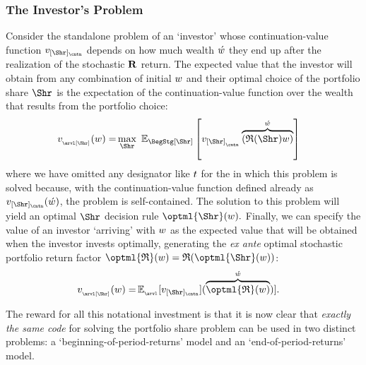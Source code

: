 \documentclass[\econtexRoot/SolvingMicroDSOPs]{subfiles}
\begin{document}
\hypertarget{subsubsec:investors-problem}{}
\subsubsection{The Investor's Problem}\label{subsubsec:investors-problem}

Consider the standalone problem of an `investor' whose continuation-value function $\vFunc_{[\Shr]_\cntn}$ depends on how much wealth $\acute{w}$ they end up after the realization of the stochastic ${\mathbf{R}}$ return.  The expected value that the investor will obtain from any combination of initial $w$ and their optimal choice of the portfolio share $\Shr$ is the expectation of the continuation-value function over the wealth that results from the portfolio choice:
\begin{equation}\begin{gathered}\begin{aligned}
  \vFunc_{_\arvl[\Shr]}(\wlthBefr)  = & \max_{\Shr}~ \Ex_{\BegStg[\Shr]}\left[\vFunc_{[\Shr]_{_\cntn}}\overbrace{\left(\Rport(\Shr){\wlthBefr}\right)}^{\wlthAftr}\right] \label{eq:vMidStgShr}
    \end{aligned}\end{gathered}\end{equation}
where we have omitted any {\interval} designator like $t$ for the {\interval} in which this problem is solved because, with the continuation-value function defined already as $\vFunc_{[\Shr]_\cntn}(\wlthAftr)$, the problem is self-contained.  The solution to this problem will yield an optimal $\Shr$ decision rule $\optml{\Shr}(\wlthBefr).$  Finally, we can specify the value of an investor `arriving' with $w$ as the expected value that will be obtained when the investor invests optimally, generating the \textit{ex ante} optimal stochastic portfolio return factor $\optml{\Rport}(\wlthBefr)=\Rport(\optml{\Shr}(\wlthBefr))$:
\begin{equation}\begin{gathered}\begin{aligned}
      \vFunc_{_\arvl[\Shr]}(\wlthBefr)  = & \Ex_{_\arvl}[\vFunc_{[\Shr]_\cntn}](\overbrace{\optml{\Rport}(\wlthBefr)}^{\wlthAftr})].
\end{aligned}\end{gathered}\end{equation}

The reward for all this notational investment is that it is now clear that \emph{exactly the same code} for solving the portfolio share problem can be used in two distinct problems: a `beginning-of-period-returns' model and an `end-of-period-returns' model.
\end{document}

